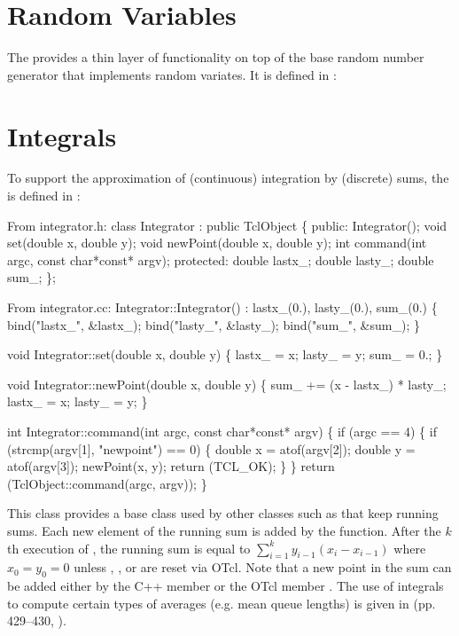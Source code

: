 \section{Random Variables}
\label{sec:ranvar}

The 
provides a thin layer of functionality on top
of the base random number generator that implements random variates.
It is defined in :

\section{Integrals}
\label{sec:integral}

To support the approximation of (continuous) integration by (discrete)
sums, the 
is defined in :
\begin{program}
{\rm From integrator.h:}
        class Integrator : public TclObject \{
        public:
                Integrator();
                void set(double x, double y);
                void newPoint(double x, double y);
                int command(int argc, const char*const* argv);
        protected:
                double lastx_;
                double lasty_;
                double sum_;
        \};

{\rm From integrator.cc:}
        Integrator::Integrator() : lastx_(0.), lasty_(0.), sum_(0.)
        \{
                bind("lastx_", &lastx_);
                bind("lasty_", &lasty_);
                bind("sum_", &sum_);
        \}

        void Integrator::set(double x, double y)
        \{
                lastx_ = x;
                lasty_ = y;
                sum_ = 0.;
        \}

        void Integrator::newPoint(double x, double y)
        \{
                sum_ += (x - lastx_) * lasty_;
                lastx_ = x;
                lasty_ = y;
        \}

        int Integrator::command(int argc, const char*const* argv)
        \{
                if (argc == 4) \{
                        if (strcmp(argv[1], "newpoint") == 0) \{
                                double x = atof(argv[2]);
                                double y = atof(argv[3]);
                                newPoint(x, y);
                                return (TCL_OK);
                        \}
                \}
                return (TclObject::command(argc, argv));
        \}
\end{program}
This class provides a base class used by other classes such
as  that keep running sums.
Each new element of the running sum is added by
the  function.
After the $k$th execution of , the running sum
is equal to $\sum_{i=1}^{k}y_{i-1}(x_i - x_{i-1})$ where
$x_0 = y_0 = 0$ unless , , or 
are reset via OTcl.
Note that a new point in the sum can be added either by the
C++ member  or the OTcl member .
The use of integrals to compute certain types of averages
(e.g. mean queue lengths) is given in (pp. 429--430, \cite{Jain91:Art}).

